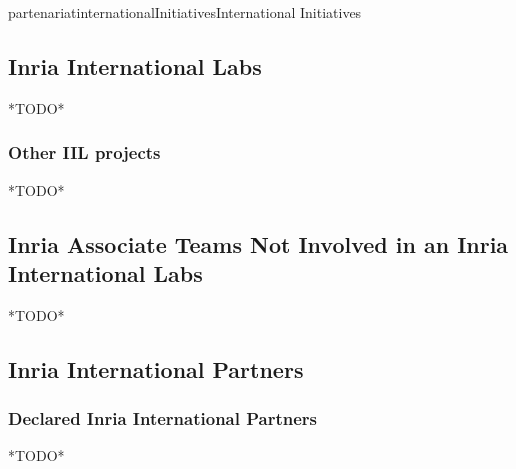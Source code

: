 \documentclass{ra2018}
\begin{document}
\begin{module}{partenariat}{internationalInitiatives}{International Initiatives}

\subsection{Inria International Labs}
*TODO*





\subsubsection{Other IIL projects}
*TODO*




\subsection{Inria Associate Teams Not Involved in an Inria International Labs}
*TODO*


%






\subsection{Inria International Partners}

        \subsubsection{Declared Inria International Partners}
        *TODO*


%







\end{module}
\end{document}
